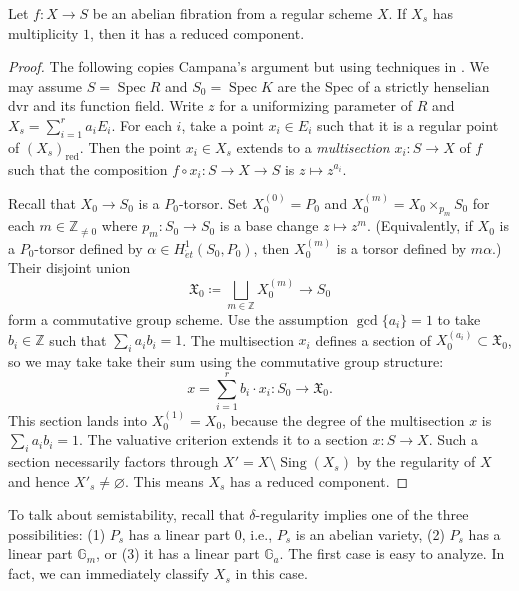\documentclass[reqno, letterpaper]{amsart}
\numberwithin{equation}{subsection}
\let\emptyset\varnothing
\let\to\longrightarrow
\let\mapsto\longmapsto
\newcommand{\GG}{\mathbb{G}}
\newcommand{\ZZ}{\mathbb{Z}}
\DeclareMathOperator{\Spec}{Spec}
\DeclareMathOperator{\Sing}{Sing}
\DeclareMathOperator{\red}{red}
\begin{document}
		\begin{lemma}  \label{lem:non-multiple fiber has reduced component}
			Let $f : X \to S$ be an abelian fibration from a regular scheme $X$. If $X_s$ has multiplicity $1$, then it has a reduced component.
		\end{lemma}
		\begin{proof}
			The following copies Campana's argument but using techniques in \cite[\S \S 25--26]{kol25:TS}. We may assume $S = \Spec R$ and $S_0 = \Spec K$ are the Spec of a strictly henselian dvr and its function field. Write $z$ for a uniformizing parameter of $R$ and $X_s = \sum_{i=1}^r a_i E_i$. For each $i$, take a point $x_i \in E_i$ such that it is a regular point of $(X_s)_{\red}$. Then the point $x_i \in X_s$ extends to a \emph{multisection} $x_i : S \to X$ of $f$ such that the composition $f \circ x_i : S \to X \to S$ is $z \mapsto z^{a_i}$. 
			
			\medskip
			
			Recall that $X_0 \to S_0$ is a $P_0$-torsor. Set $X^{(0)}_0 = P_0$ and $X^{(m)}_0 = X_0 \times_{p_m} S_0$ for each $m \in \ZZ_{\neq 0}$ where $p_m : S_0 \to S_0$ is a base change $z \mapsto z^m$. (Equivalently, if $X_0$ is a $P_0$-torsor defined by $\alpha \in H^1_{\acute et}(S_0, P_0)$, then $X^{(m)}_0$ is a torsor defined by $m \alpha$.) Their disjoint union
			\[ \mathfrak X_0 \coloneq \bigsqcup_{m \in \ZZ} X^{(m)}_0 \to S_0 \]
			form a commutative group scheme. Use the assumption $\gcd \{ a_i \} = 1$ to take $b_i \in \ZZ$ such that $\sum_i a_i b_i = 1$. The multisection $x_i$ defines a section of $X_0^{(a_i)} \subset \mathfrak X_0$, so we may take take their sum using the commutative group structure:
			\[ x = \sum_{i=1}^r b_i \cdot x_i : S_0 \to \mathfrak X_0 .\]
			This section lands into $X^{(1)}_0 = X_0$, because the degree of the multisection $x$ is $\sum_i a_i b_i = 1$. The valuative criterion extends it to a section $x : S \to X$. Such a section necessarily factors through $X' = X \setminus \Sing(X_s)$ by the regularity of $X$ \cite[Proposition~3.1.2]{neron} and hence $X'_s \neq \emptyset$. This means $X_s$ has a reduced component.
		\end{proof}
		
		To talk about semistability, recall that $\delta$-regularity implies one of the three possibilities: (1) $P_s$ has a linear part $0$, i.e., $P_s$ is an abelian variety, (2) $P_s$ has a linear part $\GG_m$, or (3) it has a linear part $\GG_a$. The first case is easy to analyze. In fact, we can immediately classify $X_s$ in this case.
		
\end{document}
